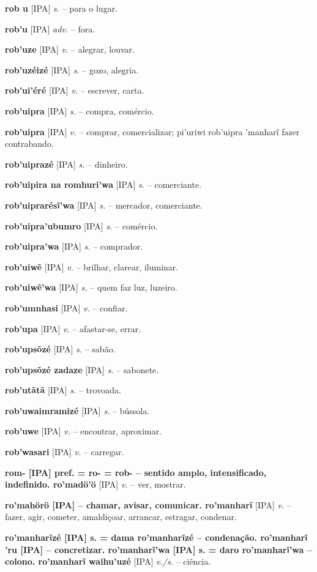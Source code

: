\textbf{rob u} [IPA] \textit{s.} -- para o lugar.

\textbf{rob'u} [IPA] \textit{adv.} -- fora.

\textbf{rob'uze} [IPA] \textit{v.} -- alegrar, louvar.

\textbf{rob'uzéizé} [IPA] \textit{s.} -- gozo, alegria.

\textbf{rob'ui'éré} [IPA] \textit{v.} -- escrever, carta.

\textbf{rob'uipra} [IPA] \textit{s.} -- compra, comércio.

\textbf{rob'uipra} [IPA] \textit{v.} -- comprar, comercializar; pi'uriwi rob'uipra 'manharĩ fazer contrabando.

\textbf{rob'uiprazé} [IPA] \textit{s.} -- dinheiro.

\textbf{rob'uipira na romhuri'wa} [IPA] \textit{s.} -- comerciante.

\textbf{rob'uiprarésĩ'wa} [IPA] \textit{s.} -- mercador, comerciante.

\textbf{rob'uipra'ubumro} [IPA] \textit{s.} -- comércio.

\textbf{rob'uipra'wa} [IPA] \textit{s.} -- comprador.

\textbf{rob'uiwẽ} [IPA] \textit{v.} -- brilhar, clarear, iluminar.

\textbf{rob'uiwẽ'wa} [IPA] \textit{s.} -- quem faz luz, luzeiro.

\textbf{rob'umnhasi} [IPA] \textit{v.} -- confiar.

\textbf{rob'upa} [IPA] \textit{v.} -- afastar-se, errar.

\textbf{rob'upsõzé} [IPA] \textit{s.} -- sabão.

\textbf{rob'upsõzé zadaze} [IPA] \textit{s.} -- sabonete.

\textbf{rob'utãtã} [IPA] \textit{s.} -- trovoada.

\textbf{rob'uwaimramizé} [IPA] \textit{s.} -- bússola.

\textbf{rob'uwe} [IPA] \textit{v.} -- encontrar, aproximar.

\textbf{rob'wasari} [IPA] \textit{v.} -- carregar.

\textbf{rom- [IPA] pref. = ro- = rob- -- sentido amplo, intensificado, indefinido. ro'madö'ö} [IPA] \textit{v.} -- ver, mostrar.

\textbf{ro'mahörö [IPA]  -- chamar, avisar, comunicar. ro'manharĩ} [IPA] \textit{v.} -- fazer, agir, cometer, amaldiçoar, arrancar, estragar, condenar.

\textbf{ro'manharĩzé [IPA] s. = dama ro'manharĩzé -- condenação. ro'manharĩ 'ru [IPA]  -- concretizar. ro'manharĩ'wa [IPA] s. = daro ro'manharĩ'wa -- colono. ro'manharĩ waihu'uzé} [IPA] \textit{v./s.} -- ciência.

